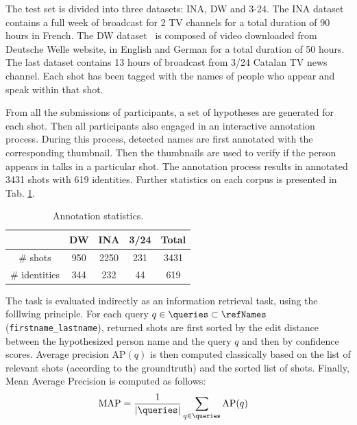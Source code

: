  The test set is divided into three datasets: INA, DW and 3-24. The INA dataset contains a full week of broadcast for 2 TV channels for a total duration of 90 hours in French. The DW dataset~\cite{EUMSSI} is composed of video downloaded from Deutsche Welle website, in English and German for a total duration of 50 hours. The last dataset contains 13 hours of broadcast from 3/24 Catalan TV news channel. Each shot has been tagged with the names of people who appear and speak within that shot.

From all the submissions of participants, a set of hypotheses are generated for each shot. Then all participants also engaged in an interactive annotation process. During this process, detected names are first annotated with the corresponding thumbnail. Then the thumbnails are used to verify if the person appears in talks in a particular shot. The annotation process results in annotated 3431 shots with 619 identities. Further statistics on each corpus is presented in Tab. \ref{tab:stats}.

\begin{table}[tb]
\centering
\caption{Annotation statistics.}
\vspace*{-2mm}
\begin{tabular}{c|c|c|c|c|}
\cline{2-5}
    						   		& DW  	& INA 	& 3/24  & Total\\ \hline
 \multicolumn{1}{|c|}{\# shots} 		& 950	& 2250  & 231 & 3431\\ \hline

 \multicolumn{1}{|c|}{\# identities} 	& 344	& 232   & 44 & 619 \\ \hline
								
\end{tabular}
%
\vspace*{-5mm}
\label{tab:stats}
\end{table}



 The task is evaluated indirectly as an information retrieval task, using the folllwing principle.
%
For each query $q \in \queries \subset \refNames$ (\texttt{first\-name\_lastname}), returned shots are first sorted by the edit distance between the hypothesized person name and the query $q$ and then by confidence scores.
Average precision $\text{AP}(q)$ is then computed classically based on the list of relevant shots (according to the groundtruth) and the sorted list of shots. Finally, Mean Average Precision is computed as follows:
\begin{align}
            \text{MAP} & = \frac{1}{|\queries|} \sum_{q \in \queries} \text{AP}(q) \nonumber
\end{align}

